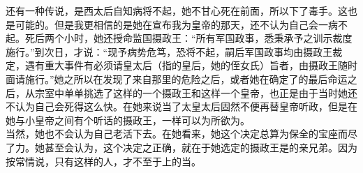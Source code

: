 还有一种传说，是西太后自知病将不起，她不甘心死在前面，所以下了毒手。这也是可能的。但是我更相信的是她在宣布我为皇帝的那天，还不认为自己会一病不起。死后两个小时，她还授命监国摄政王：“所有军国政事，悉秉承予之训示裁度施行。”到次日，才说：“现予病势危笃，恐将不起，嗣后军国政事均由摄政王裁定，遇有重大事件有必须请皇太后（指的皇后，她的侄女氏）旨者，由摄政王随时面请施行。”她之所以在发现了来自那里的危险之后，或者她在确定了的最后命运之后，从宗室中单单挑选了这样的一个摄政王和这样一个皇帝，也正是由于当时她还不认为自己会死得这么快。在她来说当了太皇太后固然不便再替皇帝听政，但是在她与小皇帝之间有个听话的摄政王，一样可以为所欲为。\\

当然，她也不会认为自己老活下去。在她看来，她这个决定总算为保全的宝座而尽了力。她甚至会认为，这个决定之正确，就在于她选定的摄政王是的亲兄弟。因为按常情说，只有这样的人，才不至于上的当。
